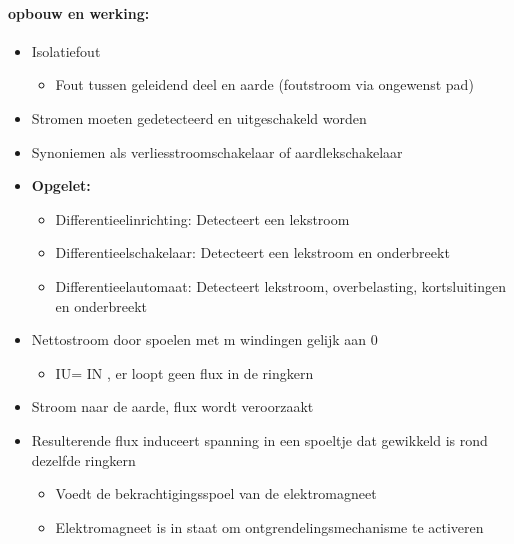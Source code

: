 \documentclass[12pt]{article}
\begin{document}
\paragraph{opbouw en werking:}
\begin{itemize}
    \item Isolatiefout\begin{itemize}
        \item Fout tussen geleidend deel en aarde (foutstroom via ongewenst pad)
    \end{itemize}
    \item Stromen moeten gedetecteerd en uitgeschakeld worden
    \item Synoniemen als verliesstroomschakelaar of aardlekschakelaar
    \item\textbf{Opgelet:}\begin{itemize}
        \item Differentieelinrichting: Detecteert een lekstroom
        \item Differentieelschakelaar: Detecteert een lekstroom en onderbreekt
        \item Differentieelautomaat: Detecteert lekstroom, overbelasting, kortsluitingen en
        onderbreekt
    \end{itemize}
    \item Nettostroom door spoelen met m windingen gelijk aan 0\begin{itemize}
        \item IU= IN , er loopt geen flux in de ringkern
    \end{itemize}
    \item Stroom naar de aarde, flux wordt veroorzaakt
    \item Resulterende flux induceert spanning in een spoeltje dat gewikkeld is rond dezelfde ringkern\begin{itemize}
        \item Voedt de bekrachtigingsspoel van de elektromagneet
        \item Elektromagneet is in staat om ontgrendelingsmechanisme te activeren
    \end{itemize}
\end{itemize}
\end{document}
